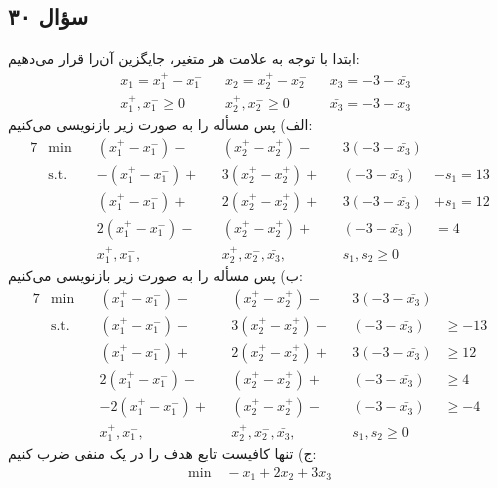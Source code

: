 \subsection*{سؤال ۳۰}
ابتدا با توجه به علامت هر متغیر، جایگزین آن‌را قرار می‌دهیم:
\begin{align*}
  &x_{1} = x^{+}_{1} - x^{-}_{1}
  &&x_{2} = x^{+}_{2} - x^{-}_{2}
  &&x_{3} = - 3 - \bar{x_{3}} \\
  &x^{+}_{1} , x^{-}_{1} \geq 0
  &&x^{+}_{2} , x^{-}_{2} \geq 0
  &&\bar{x_{3}} = -3 -x_{3}
\end{align*}
الف) پس مسأله را به صورت زیر بازنویسی می‌کنیم:
\begin{alignat*}{7}
  &\text{min} \quad&
  (x^{+}_{1} - x^{-}_{1})
  -&&(x^{+}_{2} - x^{+}_{2})
  -&&3(-3 -\bar{x_{3}})\\
  &\text{s.t.} \quad&
  -(x^{+}_{1} - x^{-}_{1})
  +&&3(x^{+}_{2} - x^{+}_{2})
  +&&(-3 -\bar{x_{3}})
  &-s_{1} = 13 \\
  &&(x^{+}_{1} - x^{-}_{1})
  +&&2(x^{+}_{2} - x^{+}_{2})
  +&&3(-3 -\bar{x_{3}})
  &+s_{1} = 12 \\
  &&2(x^{+}_{1} - x^{-}_{1})
  -&&(x^{+}_{2} - x^{+}_{2})
  +&&(-3 -\bar{x_{3}}) &= 4 \\
  &&x^{+}_{1}, x^{-}_{1}, &&x^{+}_{2},
  x^{-}_{2}, \bar{x_{3}}, &&s_{1}, s_{2} \geq 0
\end{alignat*}
ب) پس مسأله را به صورت زیر بازنویسی می‌کنیم:
\begin{alignat*}{7}
  &\text{min} \quad&
  (x^{+}_{1} - x^{-}_{1})
  -&&(x^{+}_{2} - x^{+}_{2})
  -&&3(-3 -\bar{x_{3}})\\
  &\text{s.t.} \quad&
  (x^{+}_{1} - x^{-}_{1})
  -&&3(x^{+}_{2} - x^{+}_{2})
  -&&(-3 -\bar{x_{3}})
  & \geq -13 \\
  &&(x^{+}_{1} - x^{-}_{1})
  +&&2(x^{+}_{2} - x^{+}_{2})
  +&&3(-3 -\bar{x_{3}})
  & \geq 12 \\
  &&2(x^{+}_{1} - x^{-}_{1})
  -&&(x^{+}_{2} - x^{+}_{2})
  +&&(-3 -\bar{x_{3}})
  & \geq 4 \\
  &&-2(x^{+}_{1} - x^{-}_{1})
  +&&(x^{+}_{2} - x^{+}_{2})
  -&&(-3 -\bar{x_{3}})
  & \geq -4 \\
  &&x^{+}_{1}, x^{-}_{1}, &&x^{+}_{2},
  x^{-}_{2}, \bar{x_{3}}, &&s_{1}, s_{2} \geq 0
\end{alignat*}
ج) تنها کافیست تابع هدف را در یک منفی ضرب کنیم:
\begin{align*}
  \text{min} \quad
  -x_{1} + 2x_{2} + 3x_{3}
\end{align*}

